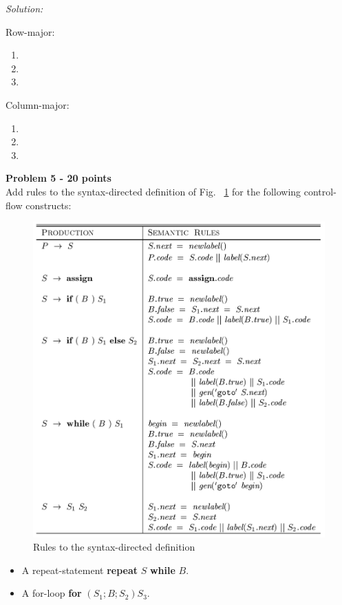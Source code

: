 \documentclass[a4paper, 11pt]{article}
\newenvironment{problem}[2][Problem]
    { \begin{mdframed}[backgroundcolor=gray!20] \textbf{#1 #2} \\}
    {  \end{mdframed}}
\newenvironment{solution}
    {\textit{Solution:}}
    {}
\begin{document}
\begin{solution}

\noindent Row-major:
\begin{enumerate}[a]
    \item 
    \item 
    \item 
\end{enumerate} 
Column-major:
\begin{enumerate}[a]
    \item 
    \item 
    \item 
\end{enumerate} 

\end{solution} 


\begin{problem}{5 - 20 points}
Add rules to the syntax-directed definition of Fig. ~\ref{fig_5}  for  the following control-flow constructs:  
\begin{figure}[H]
    \centering
    \includegraphics[scale=0.75]{sdd.png}
    \caption{Rules to the syntax-directed definition}
    \label{fig_5}
\end{figure}

\begin{itemize}
    \item A repeat-statement {\bf repeat} $S$ {\bf while} $B$.
    \item A for-loop {\bf for} $(S_1; B ; S_2 ) S_3$. 
\end{itemize}

\end{problem}
\end{document}

